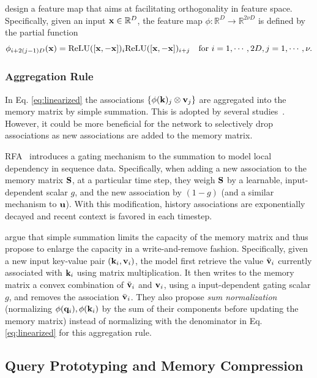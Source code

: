 \documentclass[manuscript,acmsmall,screen,nonacm]{acmart}
\theoremstyle{definition}
\begin{document}
\citet{schlag21fastweight} design a feature map that aims at facilitating orthogonality in feature space. Specifically, given an input $\mathbf{x}\in\mathbb{R}^D$, the feature map $\phi:\mathbb{R}^D\rightarrow \mathbb{R}^{2\nu D}$ is defined by the partial function
\begin{equation}
    \phi_{i+2(j-1)D}(\mathbf{x})=\mathrm{ReLU}([\mathbf{x},-\mathbf{x}])_i\mathrm{ReLU}([\mathbf{x},-\mathbf{x}])_{i+j}\quad\text{for }i=1,\cdots,2D,j=1,\cdots,\nu.
\end{equation}


\subsubsection{Aggregation Rule}
In Eq. \eqref{eq:linearized} the associations $\{\phi(\mathbf{k})_j\otimes\mathbf{v}_j\}$ are aggregated into the memory matrix by simple summation. This is adopted by several studies~\cite{katharopoulos2020linearxformer,choromanski2020masked,choromanski2020rethinking}. However, it could be more beneficial for the network to selectively drop associations as new associations are added to the memory matrix.

RFA~\cite{peng2021random} introduces a gating mechanism to the summation to model local dependency in sequence data. Specifically, when adding a new association to the memory matrix $\mathbf{S}$, at a particular time step, they weigh $\mathbf{S}$ by a learnable, input-dependent scalar $g$, and the new association by $(1-g)$ (and a similar mechanism to $\mathbf{u}$). With this modification, history associations are exponentially decayed and recent context is favored in each timestep.

\citet{schlag21fastweight} argue that simple summation limits the capacity of the memory matrix and thus propose to enlarge the capacity in a write-and-remove fashion. Specifically, given a new input key-value pair $(\mathbf{k}_i, \mathbf{v}_i)$, the model first retrieve the value $\bar{\mathbf{v}}_i$ currently associated with $\mathbf{k}_i$ using matrix multiplication. It then writes to the memory matrix a convex combination of $\bar{\mathbf{v}}_i$ and $\mathbf{v}_i$, using a input-dependent gating scalar $g$, and removes the association $\bar{\mathbf{v}}_i$. They also propose \textit{sum normalization} (normalizing $\phi(\mathbf{q}_i),\phi(\mathbf{k}_i)$ by the sum of their components before updating the memory matrix) instead of normalizing with the denominator in Eq. \eqref{eq:linearized} for this aggregation rule.

\subsection{Query Prototyping and Memory Compression}
\end{document}
